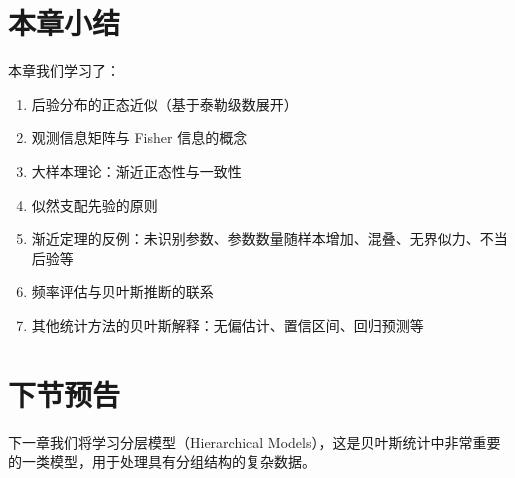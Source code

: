 \section{本章小结}

本章我们学习了：

\begin{enumerate}
  \item 后验分布的正态近似（基于泰勒级数展开）
  \item 观测信息矩阵与 Fisher 信息的概念
  \item 大样本理论：渐近正态性与一致性
  \item 似然支配先验的原则
  \item 渐近定理的反例：未识别参数、参数数量随样本增加、混叠、无界似力、不当后验等
  \item 频率评估与贝叶斯推断的联系
  \item 其他统计方法的贝叶斯解释：无偏估计、置信区间、回归预测等
\end{enumerate}

\section{下节预告}

下一章我们将学习分层模型（Hierarchical Models），这是贝叶斯统计中非常重要的一类模型，用于处理具有分组结构的复杂数据。

\endinput
